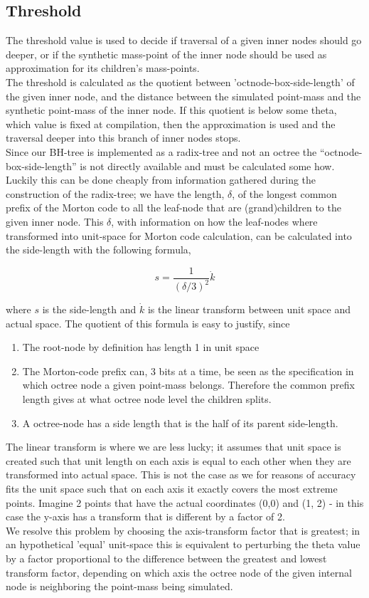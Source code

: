 \subsection{Threshold}
The threshold value is used to decide if traversal of a given inner nodes should go
deeper, or if the synthetic mass-point of the inner node should be used as
approximation for its children's mass-points. \\


The threshold is calculated as the quotient between 'octnode-box-side-length' of
the given inner node, and the distance between the simulated point-mass and the
synthetic point-mass of the inner node. If this quotient is below some theta,
which value is fixed at compilation, then the approximation is used and the
traversal deeper into this branch of inner nodes stops. \\

Since our BH-tree is implemented as a radix-tree and not an octree the
``octnode-box-side-length'' is not directly available and must be calculated some
how. Luckily this can be done cheaply from information gathered during the
construction of the radix-tree; we have the length, $\delta$, of the longest
common prefix of the Morton code to all the leaf-node that are (grand)children
to the given inner node. This $\delta$, with information on how the leaf-nodes
where transformed into unit-space for Morton code calculation, can be calculated
into the side-length with the following formula,

$$s = \frac{1}{(\delta / 3)^2} \dot k$$

where $s$ is the side-length and $\dot k$ is the linear transform between unit
space and actual space. The quotient of this formula is easy to justify, since
\begin{enumerate}
\item The root-node by definition has length 1 in unit space
\item The Morton-code prefix can, 3 bits at a time, be seen as the specification
  in which octree node a given point-mass belongs. Therefore the common prefix length
  gives at what octree node level the children splits.
  \item A octree-node has a side length that is the half of its parent
    side-length.
\end{enumerate}
The linear transform is where we are less lucky; it assumes that unit space is
created such that unit length on each axis is equal to each other when they are
transformed into actual space. This is not the case as we for reasons of accuracy
fits the unit space such that on each axis it exactly covers the most extreme
points. Imagine 2 points that have the actual coordinates (0,0) and (1, 2) - in this
case the y-axis has a transform that is different by a factor of 2. \\

We resolve this problem by choosing the axis-transform factor that is greatest;
in an hypothetical 'equal' unit-space this is equivalent to perturbing the theta
value by a factor proportional to the difference between the greatest and lowest
transform factor, depending on which axis the octree node of the given internal node
is neighboring the point-mass being simulated.
